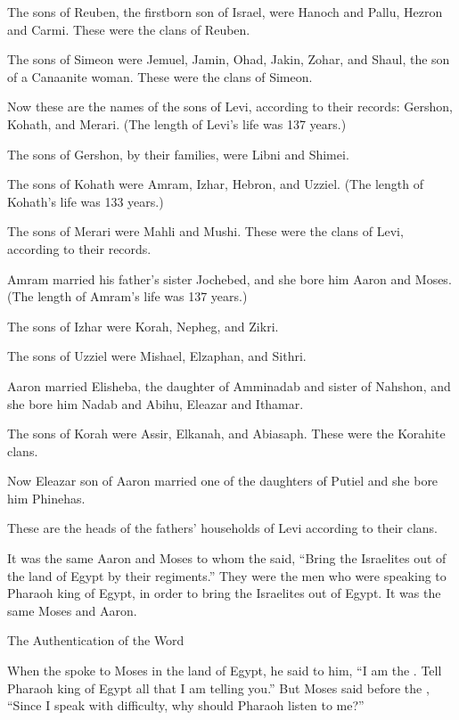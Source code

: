 {\par }{\PP The sons
of Reuben,
the firstborn son
of Israel,
were Hanoch
and Pallu,
Hezron
and Carmi.
These
were the clans
of Reuben.
\par }{\PP {}The sons
of Simeon
were Jemuel,
Jamin,
Ohad,
Jakin,
Zohar,
and Shaul,
the son
of a Canaanite
woman. These
were the clans
of Simeon.
\par }{\PP {}Now these
are the names
of the sons
of Levi,
according to their records: Gershon,
Kohath,
and Merari.
(The length of Levi’s
life
was 137
years.)
\par }{\PP {}The sons
of Gershon,
by their families,
were Libni
and Shimei.
\par }{\PP {}The sons
of Kohath
were Amram,
Izhar,
Hebron,
and Uzziel.
(The length
of Kohath’s
life
was 133
years.)
\par }{\PP {}The sons
of Merari
were Mahli
and Mushi.
These
were the clans
of Levi,
according to their records.
\par }{\PP {}Amram
married
his father’s sister
Jochebed,
and she
bore
him Aaron
and Moses.
(The length
of Amram’s
life
was 137
years.)
\par }{\PP {}The sons
of Izhar
were Korah,
Nepheg,
and Zikri.
\par }{\PP {}The sons
of Uzziel
were Mishael,
Elzaphan,
and Sithri.
\par }{\PP {}Aaron
married
Elisheba,
the daughter
of Amminadab
and sister
of Nahshon,
and she bore
him Nadab
and Abihu,
Eleazar
and Ithamar.
\par }{\PP {}The sons
of Korah
were Assir,
Elkanah,
and Abiasaph.
These
were the Korahite
clans.
\par }{\PP {}Now Eleazar
son
of Aaron
married
one of the daughters
of Putiel
and she bore
him Phinehas.
\par }{\PP These
are the heads
of the fathers’
households of Levi
according to their clans.
\par }{\PP {}It was the same
Aaron
and Moses
to whom
the {}
said,
“Bring
the Israelites
out of the land
of Egypt
by
their regiments.”
They
were the men who were speaking
to
Pharaoh
king
of Egypt,
in order to bring
the Israelites
out of Egypt.
It was the same
Moses
and Aaron.
\par }{\SH The Authentication of the Word
\par }{\PP {}When
the {}
spoke
to
Moses
in the land
of Egypt,
he said
to
him, “I am
the {}. Tell
Pharaoh
king
of Egypt
all
that
I
am telling you.”
But Moses
said
before
the {}, “Since
I
speak
with difficulty,
why
should Pharaoh
listen
to me?”

}
